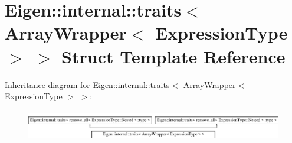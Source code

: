 \hypertarget{struct_eigen_1_1internal_1_1traits_3_01_array_wrapper_3_01_expression_type_01_4_01_4}{}\section{Eigen\+:\+:internal\+:\+:traits$<$ Array\+Wrapper$<$ Expression\+Type $>$ $>$ Struct Template Reference}
\label{struct_eigen_1_1internal_1_1traits_3_01_array_wrapper_3_01_expression_type_01_4_01_4}
Inheritance diagram for Eigen\+:\+:internal\+:\+:traits$<$ Array\+Wrapper$<$ Expression\+Type $>$ $>$\+:\begin{figure}[H]
\begin{center}
\leavevmode
\includegraphics[height=1.372549cm]{struct_eigen_1_1internal_1_1traits_3_01_array_wrapper_3_01_expression_type_01_4_01_4}
\end{center}
\end{figure}
